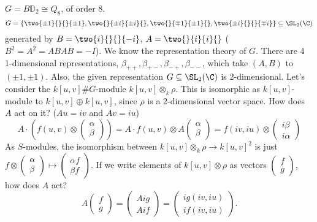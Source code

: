 \begin{ex}
$G= B\mathbb{D}_2 \cong Q_8$, of order 8. 
	\[
	G= \left\{ \two{\pm 1}{}{}{\pm 1}, \two{}{\pm i}{\pm i}{}, \two{}{\mp 1}{\pm 1}{}, \two{\pm i}{}{}{\mp i} \right\} \subseteq \SL_2(\C)
	\]
generated by $B= \two{i}{}{}{-i}$, $A= \two{}{i}{i}{}$ ($B^2=A^2=ABAB= -I$). We know the representation theory of $G$. There are 4 1-dimensional representations, $\beta_{++}, \beta_{+-}, \beta_{-+}, \beta_{--}$, which take $(A,B)$ to $(\pm 1, \pm 1)$. Also, the given representation $G \subseteq \SL_2(\C)$ is 2-dimensional. Let's consider the $k[u,v]\#G$-module $k[u,v] \otimes_k \rho$. This is isomorphic as $k[u,v]$-module to $k[u,v] \oplus k[u,v]$, since $\rho$ is a 2-dimensional vector space. How does $A$ act on it? ($Au=iv$ and $Av=iu$)
	\[
	A \cdot \left( f(u,v) \otimes \begin{pmatrix} \alpha \\ \beta \end{pmatrix} \right) = A \cdot f(u,v) \otimes A \begin{pmatrix} \alpha \\ \beta \end{pmatrix}= f(iv,iu) \otimes \begin{pmatrix} i\beta \\ i\alpha \end{pmatrix}
	\]
As $S$-modules, the isomorphism between $k[u,v] \otimes_k \rho \to k[u,v]^2$ is just $f \otimes \begin{pmatrix} \alpha \\ \beta \end{pmatrix} \mapsto \begin{pmatrix} \alpha f  \\ \beta f \end{pmatrix}$. If we write elements of $k[u,v] \otimes \rho$ as vectors $\begin{pmatrix} f \\ g \end{pmatrix}$, how does $A$ act? 
	\[
	A \begin{pmatrix} f \\ g \end{pmatrix} = \begin{pmatrix} Aig \\ Aif \end{pmatrix}= \begin{pmatrix} ig(iv,iu) \\ if(iv,iu) \end{pmatrix}.
	\]
\end{ex}


